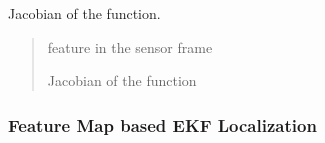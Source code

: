 \documentclass[letterpaper,10pt,english]{sphinxmanual}
\begin{document}
\begin{fulllineitems}
\begin{fulllineitems}
\label{\detokenize{FEKFMBLocalization:MapFeature.Cartesian2DStoredPolarObservedMapFeature.J_s2o}}
\pysigstartsignatures
{}
\pysigstopsignatures
\sphinxAtStartPar
Jacobian of the {\hyperref[\detokenize{FEKFMBLocalization:MapFeature.Cartesian2DStoredPolarObservedMapFeature.s2o}]{}} function.
\begin{quote}\begin{description}
\sphinxAtStartPar
{} \textendash{} feature in the sensor frame

\sphinxAtStartPar
Jacobian of the {\hyperref[\detokenize{FEKFMBLocalization:MapFeature.Cartesian2DStoredPolarObservedMapFeature.s2o}]{}} function

\end{description}\end{quote}

\end{fulllineitems}


\end{fulllineitems}



\subsubsection{Feature Map based EKF Localization}
\label{\detokenize{FEKFMBLocalization:id1}}
\begin{figure}[htbp]
\centering

\noindent{}
\end{figure}
\end{document}
